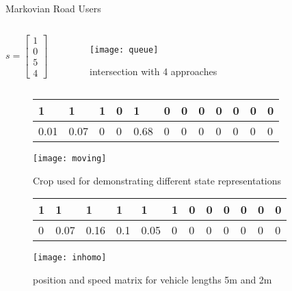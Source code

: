 \begin{frame}{Markovian Road Users}
          \begin{columns}[c,onlytextwidth]
\begin{equation*}
s= \begin{bmatrix}
           1 \\
          0 \\
           5\\
           4
         \end{bmatrix}
\end{equation*}
    \begin{figure}
\texttt{[image: queue]}
\caption{intersection with 4 approaches}
    \end{figure}
        

  \end{columns}
\end{frame}

\begin{frame}
\begin{figure}
\begin{tabularx}{\textwidth}{|X|X|X|X|X|X|X|X|X|X|X|X|}
\hline
1 & 1 & 1 & 0 & 1 & 0 & 0 & 0 & 0 & 0 & 0 & 0 \\ \hline
0.01 & 0.07 & 0 & 0 & 0.68 & 0 & 0 & 0 & 0 & 0 & 0 & 0 \\ \hline
\end{tabularx}
\texttt{[image: moving]}
\caption{Crop used for demonstrating different state representations}
\end{figure}
\end{frame}
\begin{frame}
\begin{figure}
\begin{tabularx}{\textwidth}{|X|X|X|X|X|X|X|X|X|X|X|X|}
\hline
1 & 1 & 1 & 1 & 1 & 1 & 0 & 0 & 0 & 0 & 0 & 0 \\ \hline
0 & 0.07 & 0.16 & 0.1 & 0.05 & 0 & 0 & 0 & 0 & 0 & 0 & 0 \\ \hline
\end{tabularx}
\texttt{[image: inhomo]}
\caption{position and speed matrix for vehicle lengths 5m and 2m }
\end{figure}
\end{frame}



